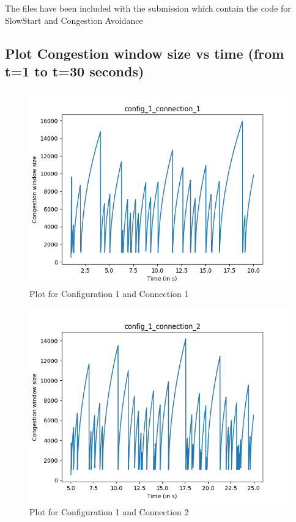\documentclass{article}
\begin{document}
The files have been included with the submission which contain the code for SlowStart and Congestion Avoidance

\subsection{Plot Congestion window size vs time (from t=1 to t=30 seconds)}

\begin{figure}[H]
    \centering
    \includegraphics[scale = 0.8]{Q3/outputs/plots/config_1_connection_1.png}
    \caption{Plot for Configuration 1 and Connection 1}
\end{figure}

\begin{figure}[H]
    \centering
    \includegraphics[scale = 0.8]{Q3/outputs/plots/config_1_connection_2.png}
    \caption{Plot for Configuration 1 and Connection 2}
\end{figure}
\end{document}
